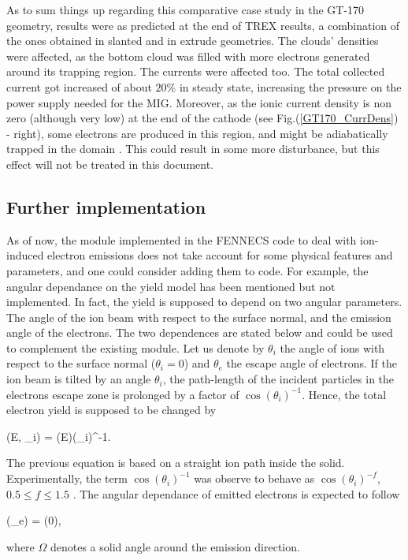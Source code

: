 As to sum things up regarding this comparative case study in the GT-170 geometry, results were as predicted at the end of TREX results, a combination of the ones obtained in slanted and in extrude geometries. The clouds' densities were affected, as the bottom cloud was filled with more electrons generated around its trapping region. The currents were affected too. The total collected current got increased of about $20\%$ in steady state, increasing the pressure on the power supply needed for the MIG. Moreover, as the ionic current density is non zero (although very low) at the end of the cathode (see Fig.(\ref{GT170_CurrDens}) - right), some electrons are produced in this region, and might be adiabatically trapped in the domain \cite{Pagonakis}. This could result in some more disturbance, but this effect will not be treated in this document. \\


\subsection{Further implementation}

As of now, the module implemented in the FENNECS code to deal with ion-induced electron emissions does not take account for some physical features and parameters, and one could consider adding them to code. For example, the angular dependance on the yield model has been mentioned but not implemented. In fact, the yield is supposed to depend on two angular parameters. The angle of the ion beam with respect to the surface normal, and the emission angle of the electrons. The two dependences are stated below and could be used to complement the existing module. Let us denote by $\theta_i$ the angle of ions with respect to the surface normal ($\theta_i = 0$) and $\theta_e$ the escape angle of electrons. If the ion beam is tilted by an angle $\theta_i$, the path-length of the incident particles in the electrons escape zone is prolonged by a factor of $\cos(\theta_i)^{-1}$. Hence, the total electron yield is supposed to be changed by 

\beq
\gamma(E, \theta_i) = \gamma(E)\cdot \cos(\theta_i)^{-1}.
\eeq

\noindent The previous equation is based on a straight ion path inside the solid. Experimentally, the term $\cos(\theta_i)^{-1}$ was observe to behave as $\cos(\theta_i)^{-f}$, $0.5 \leq f \leq 1.5$ \cite{HasselII}. The angular dependance of emitted electrons is expected to follow 

\beq
{}(\theta_e) = (0)\cdot \cos{\theta}, 
\eeq

\noindent where $\Omega$ denotes a solid angle around the emission direction.\\


